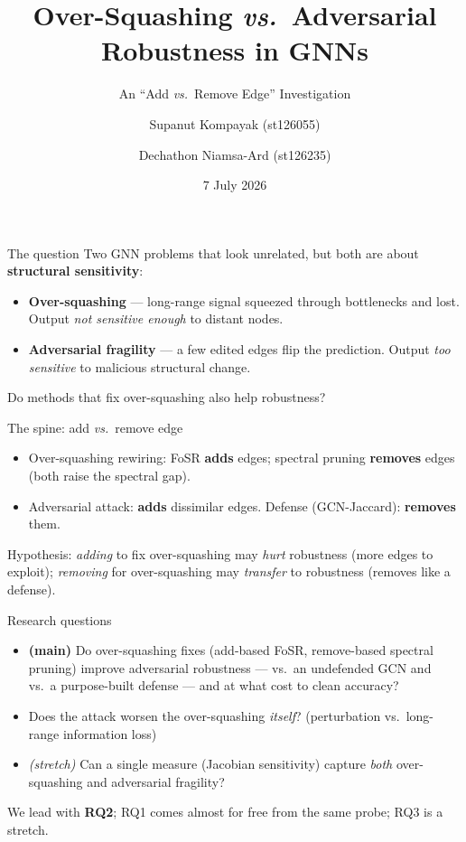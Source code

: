 \documentclass[aspectratio=169]{beamer}
\title[Over-Squashing vs.\ Robustness]{Over-Squashing \emph{vs.}\ Adversarial Robustness in GNNs}
\subtitle{An ``Add \emph{vs.}\ Remove Edge'' Investigation}
\author[Kompayak, Niamsa-Ard]{Supanut Kompayak (st126055) \and Dechathon Niamsa-Ard (st126235)}
\institute[AIT]{Deep Learning Course Project, Asian Institute of Technology}
\date{7 July 2026}
\begin{document}
\frame{\titlepage}

\begin{frame}{The question}
  Two GNN problems that look unrelated, but both are about \textbf{structural sensitivity}:
  \begin{itemize}
    \item \textbf{Over-squashing} --- long-range signal squeezed through bottlenecks and lost.
      Output \emph{not sensitive enough} to distant nodes.
    \item \textbf{Adversarial fragility} --- a few edited edges flip the prediction.
      Output \emph{too sensitive} to malicious structural change.
  \end{itemize}
  \vfill
  \centering\Large Do methods that fix over-squashing also help robustness?
\end{frame}

\begin{frame}{The spine: add \emph{vs.}\ remove edge}
  \begin{itemize}
    \item Over-squashing rewiring: FoSR \textbf{adds} edges; spectral pruning \textbf{removes} edges
      (both raise the spectral gap).
    \item Adversarial attack: \textbf{adds} dissimilar edges. Defense (GCN-Jaccard): \textbf{removes} them.
  \end{itemize}
  \vfill
  Hypothesis: \emph{adding} to fix over-squashing may \emph{hurt} robustness (more edges to exploit);
  \emph{removing} for over-squashing may \emph{transfer} to robustness (removes like a defense).
\end{frame}

\begin{frame}{Research questions}
  \begin{itemize}
    \item[\textbf{RQ2}] \textbf{(main)} Do over-squashing fixes (add-based FoSR, remove-based spectral
      pruning) improve adversarial robustness --- vs.\ an undefended GCN and vs.\ a purpose-built defense
      --- and at what cost to clean accuracy?
    \item[\textbf{RQ1}] Does the attack worsen the over-squashing \emph{itself}? (perturbation vs.\
      long-range information loss)
    \item[\textbf{RQ3}] \emph{(stretch)} Can a single measure (Jacobian sensitivity) capture \emph{both}
      over-squashing and adversarial fragility?
  \end{itemize}
  \vfill
  {\footnotesize We lead with \textbf{RQ2}; RQ1 comes almost for free from the same probe; RQ3 is a stretch.}
\end{frame}
\end{document}
